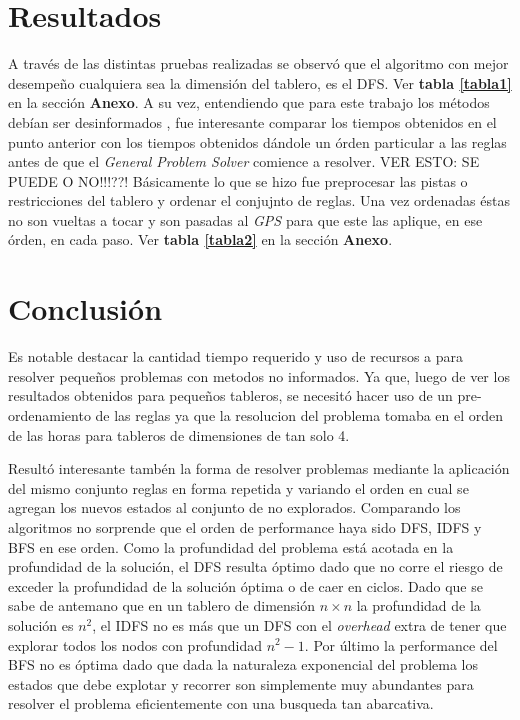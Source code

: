 \documentclass[%
	final,
	reprint,
	notitlepage,
	narroweqnarray,
	inline,
	twoside,
	invited
	]{ieee}
\begin{document}
\section{Resultados}

\par A través de las distintas pruebas realizadas se observó que el algoritmo con mejor desempeño cualquiera sea la dimensión del tablero, es el DFS. Ver \textbf{tabla \ref{tabla1}} en la sección \textbf{Anexo}. A su vez, entendiendo que para este trabajo los métodos debían ser desinformados , fue interesante comparar los tiempos obtenidos en el punto anterior con los tiempos obtenidos dándole un órden particular a las reglas antes de que el \textit{General Problem Solver} comience a resolver. VER ESTO: SE PUEDE O NO!!!??! Básicamente lo que se hizo fue preprocesar las pistas o restricciones del tablero y ordenar el conjujnto de reglas. Una vez ordenadas éstas no son vueltas a tocar y son pasadas al \textit{GPS} para que este las aplique, en ese órden, en cada paso. Ver \textbf{tabla \ref{tabla2}} en la sección \textbf{Anexo}.

\section{Conclusión}

\PARstart Es notable destacar la cantidad tiempo requerido y uso de recursos a para resolver pequeños problemas con metodos no informados. Ya que, luego de ver los resultados obtenidos para pequeños tableros, se necesitó hacer uso de un pre-ordenamiento de las reglas ya que la resolucion del problema tomaba en el orden de las horas para tableros de dimensiones de tan solo 4.

Resultó interesante tambén la forma de resolver problemas mediante la aplicación del mismo conjunto reglas en forma repetida y variando el orden
en cual se agregan los nuevos estados al conjunto de no explorados. 
Comparando los algoritmos no sorprende que el orden de performance haya sido DFS, IDFS y BFS en ese orden. Como la profundidad del problema está acotada 
en la profundidad de la solución, el DFS resulta óptimo dado que no corre el riesgo de exceder la profundidad de la solución óptima o de caer 
en ciclos. Dado que se sabe de antemano que en un tablero 
de dimensión $n \times n$ la profundidad de la solución es $n^{2}$, el IDFS no es más que un DFS con el \textit{overhead} extra de tener que explorar 
todos los nodos con profundidad $n^{2} - 1$. Por último la performance del BFS no es óptima dado que dada la naturaleza exponencial del problema los estados 
que debe explotar y recorrer son simplemente muy abundantes para resolver el problema eficientemente con una busqueda tan abarcativa. 
\end{document}

